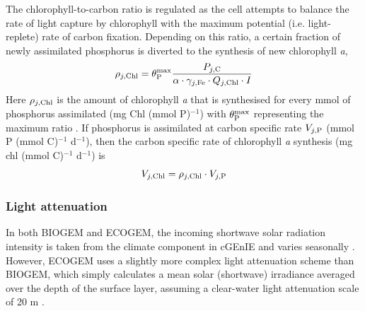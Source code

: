 \documentclass[gmd, manuscript]{copernicus}
\begin{document}
The chlorophyll-to-carbon ratio is regulated as the cell attempts to balance the rate of light capture by chlorophyll with the maximum potential (i.e. light-replete) rate of carbon fixation. Depending on this ratio, a certain fraction of newly assimilated phosphorus is diverted to the synthesis of new chlorophyll \textit{a}, 
%
\begin{equation}
\rho_{j,{\rm Chl}} = \theta_{\rm P}^{\rm max} \frac{P_{j,{\rm C}}}{\alpha \cdot \gamma_{j,{\rm Fe}} \cdot Q_{j,{\rm Chl}} \cdot {I}}
\end{equation}
%
Here $\rho_{j,{\rm Chl}}$ is the amount of chlorophyll \textit{a} that is synthesised for every mmol of phosphorus assimilated (mg Chl (mmol P)$^{-1}$) with $\theta_{\rm P}^{\rm max}$ representing the maximum ratio  \citep[again converting from the nitrogen based units of ][with a fixed N:P ratio of 16]{Geider:1998}.  If phosphorus is assimilated at carbon specific rate $V_{j,{\rm P}}$ (mmol P (mmol C)$^{-1}$ d$^{-1}$), then the carbon specific rate of chlorophyll \textit{a} synthesis (mg chl (mmol C)$^{-1}$ d$^{-1}$) is
%
\begin{equation}
V_{j,{\rm Chl}} = \rho_{j,{\rm Chl}} \cdot V_{j,{\rm P}}
\label{chl_synthesis}
\end{equation}
%

\subsubsection{Light attenuation}

In both BIOGEM and ECOGEM,  the incoming shortwave solar radiation intensity is taken from the climate component in cGEnIE and varies seasonally \citep{Edwards:2005, Marsh:2011}. However, ECOGEM uses a slightly more complex light attenuation scheme than BIOGEM, which simply calculates a mean solar (shortwave) irradiance averaged over the depth of the surface layer, assuming a clear-water light attenuation scale of 20 m \citep{Doney:2006b}. 
\end{document}
